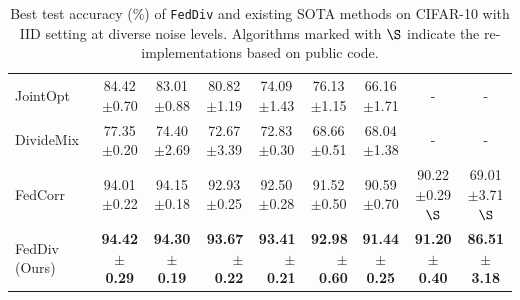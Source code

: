 \documentclass[letterpaper]{article} %
\begin{document}
\begin{table}[t]
{\begin{tabular}{l|ccrrrccc}
        JointOpt~\cite{JointOpt}          & 84.42$\pm$0.70          & 83.01$\pm$0.88          & \multicolumn{1}{c}{80.82$\pm$1.19} & \multicolumn{1}{c}{74.09$\pm$1.43} & \multicolumn{1}{c}{76.13$\pm$1.15} & 66.16$\pm$1.71          & -                       & - \\
        DivideMix~\cite{li2019dividemix}  & 77.35$\pm$0.20          & 74.40$\pm$2.69          & \multicolumn{1}{c}{72.67$\pm$3.39} & \multicolumn{1}{c}{72.83$\pm$0.30} & \multicolumn{1}{c}{68.66$\pm$0.51} & 68.04$\pm$1.38          & -                       & - \\
        FedCorr~\cite{xu2022fedcorr}      & 94.01$\pm$0.22          & 94.15$\pm$0.18          & \multicolumn{1}{c}{92.93$\pm$0.25} & \multicolumn{1}{c}{92.50$\pm$0.28} & \multicolumn{1}{c}{91.52$\pm$0.50} & 90.59$\pm$0.70          & 90.22$\pm$0.29$\S$      & 69.01$\pm$3.71$\S$\\
        FedDiv (Ours)                     & \textbf{94.42$\pm$0.29} & \textbf{94.30$\pm$0.19} & \textbf{93.67$\pm$0.22}            & \textbf{93.41$\pm$0.21}            & \textbf{92.98$\pm$0.60}            & \textbf{91.44$\pm$0.25} & \textbf{91.20$\pm$0.40} & \textbf{86.51$\pm$3.18} \\
        \bottomrule
    \end{tabular}%
    }

    \caption{Best test accuracy (\%) of \texttt{FedDiv} and existing SOTA methods on CIFAR-10 with IID setting at diverse noise levels.
    Algorithms marked with $\S$ indicate the re-implementations based on public code.}
    \label{Table:CIFAR10-IID}%

\end{table}%
\end{document}
